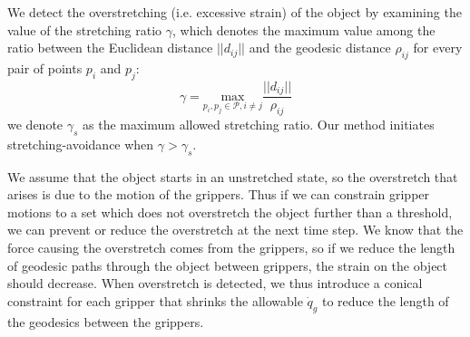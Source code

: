 

We detect the overstretching  (i.e. excessive strain) of the object by examining the value of the stretching ratio $\gamma$, which denotes the maximum value among the ratio between the Euclidean distance $||d_{ij}||$ and the geodesic distance $\rho_{ij}$ for every pair of points $p_i$ and $p_j$:
\begin{equation}
\gamma = \underset{p_i, p_j \in \mathcal{P}, i\neq j}{\text{max}} \frac{||d_{ij}||}{\rho_{ij}}
\label{Ex: Method_stretching_detection}
\end{equation}
we denote $\gamma_s$ as the maximum allowed stretching ratio. Our method initiates stretching-avoidance when $\gamma > \gamma_s$.


We assume that the object starts in an unstretched state, so the overstretch that arises is due to the motion of the grippers. Thus if we can constrain gripper motions to a set which does not overstretch the object further than a threshold, we can prevent or reduce the overstretch at the next time step. We know that the force causing the overstretch comes from the grippers, so if we reduce the length of geodesic paths through the object between grippers, the strain on the object should decrease. When overstretch is detected, we thus introduce a conical constraint for each gripper that shrinks the allowable $\dot{q}_g$ to reduce the length of the geodesics between the grippers. 





